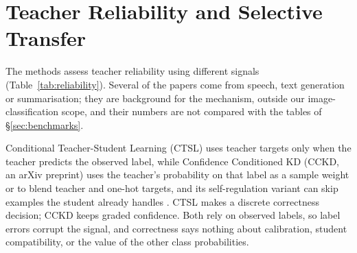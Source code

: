 \section{Teacher Reliability and Selective Transfer}
\label{sec:reliability}

The methods assess teacher reliability using different signals (Table~\ref{tab:reliability}). Several of the papers come from speech, text generation or summarisation; they are background for the mechanism, outside our image-classification scope, and their numbers are not compared with the tables of \S\ref{sec:benchmarks}.

Conditional Teacher-Student Learning (CTSL) uses teacher targets only when the teacher predicts the observed label, while Confidence Conditioned KD (CCKD, an arXiv preprint) uses the teacher's probability on that label as a sample weight or to blend teacher and one-hot targets, and its self-regulation variant can skip examples the student already handles \citep{meng2019conditionalts,mishra2021cckd}. CTSL makes a discrete correctness decision; CCKD keeps graded confidence. Both rely on observed labels, so label errors corrupt the signal, and correctness says nothing about calibration, student compatibility, or the value of the other class probabilities. %

